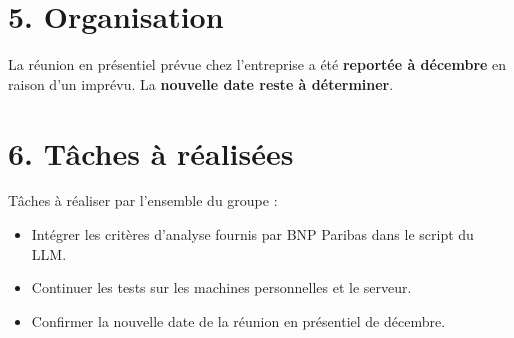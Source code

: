 \documentclass[a4paper,11pt]{article}
\begin{document}
\section*{5. Organisation}
La réunion en présentiel prévue chez l’entreprise a été \textbf{reportée à décembre} en raison d’un imprévu.  
La \textbf{nouvelle date reste à déterminer}.

\section*{6. Tâches à réalisées}

Tâches à réaliser par l'ensemble du groupe :
\begin{itemize}
    \item Intégrer les critères d’analyse fournis par BNP Paribas dans le script du LLM.
    \item Continuer les tests sur les machines personnelles et le serveur.
    \item Confirmer la nouvelle date de la réunion en présentiel de décembre.
\end{itemize}
\end{document}
